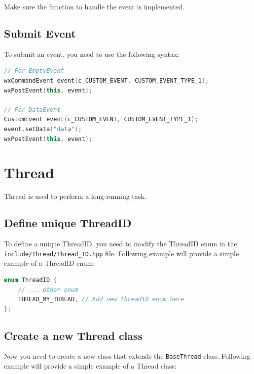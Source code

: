 Make sure the function to handle the event is implemented.

\section{Submit Event}

To submit an event, you need to use the following syntax:

\begin{lstlisting}[language=C++, caption={Submitting Event}]
// For EmptyEvent
wxCommandEvent event(c_CUSTOM_EVENT, CUSTOM_EVENT_TYPE_1);
wxPostEvent(this, event);

// For DataEvent
CustomEvent event(c_CUSTOM_EVENT, CUSTOM_EVENT_TYPE_1);
event.setData("data");
wxPostEvent(this, event);
\end{lstlisting}

\chapter{Thread}

Thread is used to perform a long-running task.

\section{Define unique ThreadID}

To define a unique ThreadID, you need to modify the ThreadID enum in the \texttt{include/Thread/Thread\_ID.hpp} file. Following example will provide a simple example of a ThreadID enum:

\begin{lstlisting}[language=C++, caption={ThreadID enum example}]
enum ThreadID {
    // ... other enum
    THREAD_MY_THREAD, // Add new ThreadID enum here
};
\end{lstlisting}

\section{Create a new Thread class}

Now you need to create a new class that extends the \texttt{BaseThread} class. Following example will provide a simple example of a Thread class:

